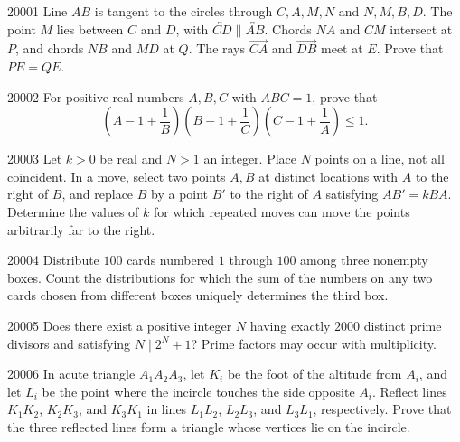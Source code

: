 
\begin{problem}{2000}{1}
Line $AB$ is tangent to the circles through $C, A, M, N$ and $N, M, B, D$. The point $M$ lies between $C$ and $D$, with $\overleftrightarrow{CD}\parallel\overleftrightarrow{AB}$. Chords $NA$ and $CM$ intersect at $P$, and chords $NB$ and $MD$ at $Q$. The rays $\overrightarrow{CA}$ and $\overrightarrow{DB}$ meet at $E$. Prove that $PE=QE$.
\end{problem}

\begin{problem}{2000}{2}
For positive real numbers $A, B, C$ with $ABC=1$, prove that
\[
    \left(A-1+\frac1B\right)\left(B-1+\frac1C\right)\left(C-1+\frac1A\right)\leq1.
\]
\end{problem}

\begin{problem}{2000}{3}
Let $k>0$ be real and $N>1$ an integer. Place $N$ points on a line, not all coincident. In a move, select two points $A, B$ at distinct locations with $A$ to the right of $B$, and replace $B$ by a point $B'$ to the right of $A$ satisfying $AB'=kBA$. Determine the values of $k$ for which repeated moves can move the points arbitrarily far to the right.
\end{problem}

\begin{problem}{2000}{4}
Distribute $100$ cards numbered $1$ through $100$ among three nonempty boxes. Count the distributions for which the sum of the numbers on any two cards chosen from different boxes uniquely determines the third box.
\end{problem}

\begin{problem}{2000}{5}
Does there exist a positive integer $N$ having exactly $2000$ distinct prime divisors and satisfying $N\mid 2^N+1$? Prime factors may occur with multiplicity.
\end{problem}

\begin{problem}{2000}{6}
In acute triangle $A_1A_2A_3$, let $K_i$ be the foot of the altitude from $A_i$, and let $L_i$ be the point where the incircle touches the side opposite $A_i$. Reflect lines $K_1K_2$, $K_2K_3$, and $K_3K_1$ in lines $L_1L_2$, $L_2L_3$, and $L_3L_1$, respectively. Prove that the three reflected lines form a triangle whose vertices lie on the incircle.
\end{problem}

